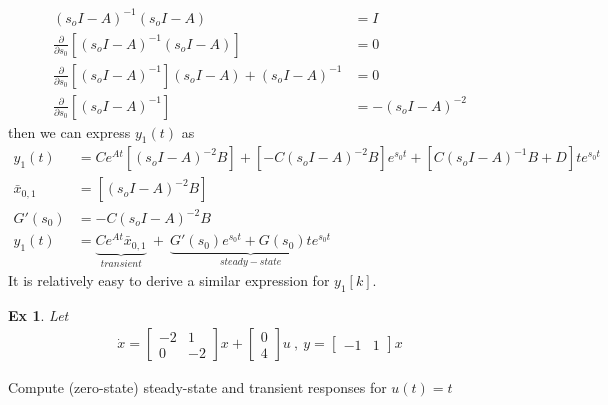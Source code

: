 \documentclass[twoside]{article}
\newtheorem{exmp}[theorem]{Ex}
\begin{document}
%
\begin{align*} 
(s_o I - A)^{-1} (s_o I - A) & = I
\\[1ex]
\frac{\partial}{\partial s_0} \left[ (s_o I - A)^{-1} (s_o I - A)
  \right] &= 0
\\[1ex]
\frac{\partial}{\partial s_0} \left[ (s_o I - A)^{-1} \right] (s_o I - A)
+ (s_o I - A)^{-1} &= 0
\\[1ex]
\frac{\partial}{\partial s_0} \left[ (s_o I - A)^{-1} \right] &= - (s_o I - A)^{-2}
\end{align*}
%
then we can express $y_1(t)$ as
%
\begin{align*} 
y_1(t) &= C e^{A t} \left[ (s_o I - A)^{-2} B \right] + \left[ -C (s_o
         I - A)^{-2} B \right] e^{s_0 t} + \left[ C (s_o I -
         A)^{-1} B + D \right] t e^{s_0 t}
\\[1ex]
\bar{x}_{0,1} &= \left[ (s_o I - A)^{-2} B \right]                 
\\[1ex]
G'(s_0) &= -C (s_o I - A)^{-2} B 
\\[1ex]
y_1(t) &= \underbrace{C e^{A t} \bar{x}_{0,1}}_{transient} \ + \ \underbrace{ G'(s_0) e^{s_0 t} + G(s_0) t e^{s_0 t}}_{steady-state}
\end{align*}
%
It is relatively easy to derive a similar expression for $y_1[k]$.

\begin{exmp}
Let
\begin{align*} 
\dot{x} = \begin{bmatrix} -2 & 1 \\ 0 & -2 \end{bmatrix} x + \begin{bmatrix} 0 \\ 4 \end{bmatrix} u \ , \ y = \begin{bmatrix} -1 & 1 \end{bmatrix} x 
\end{align*}
\end{exmp}
%
Compute (zero-state) steady-state and transient responses for $u(t) =
t$
\end{document}
